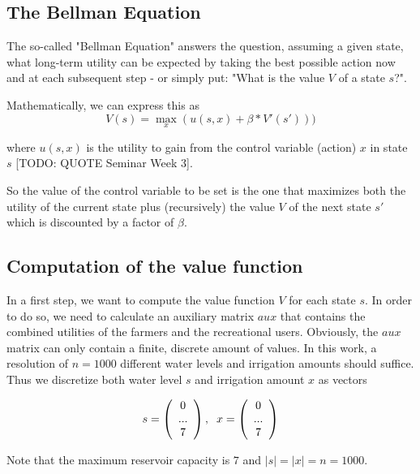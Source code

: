\documentclass[12pt, a4paper, oneside]{article}
\begin{document}
\subsection{The Bellman Equation}

The so-called "Bellman Equation" answers the question, assuming a given state, what long-term utility can be expected by taking the best possible action now and at each subsequent step - or simply put: "What is the value $V$ of a state $s$?". 

Mathematically, we can express this as  
\begin{equation}
V(s) = \max_{x}(u(s,x) + \beta*V'(s')))
\end{equation}

where $u(s,x)$ is the utility to gain from the control variable (action) $x$ in state $s$ [TODO: QUOTE Seminar Week 3]. 

So the value of the control variable to be set is the one that maximizes both the utility of the current state plus (recursively) the value $V$ of the next state $s'$ which is discounted by a factor of $\beta$. 


\subsection{Computation of the value function}

In a first step, we want to compute the value function $V$ for each state $s$. 
In order to do so, we need to calculate an auxiliary matrix $aux$ that contains the combined utilities of the farmers and the recreational users. 
Obviously, the $aux$ matrix can only contain a finite, discrete amount of values. In this work, a resolution of $n = 1000$ different water levels and irrigation amounts should suffice. 
Thus we discretize both water level $s$ and irrigation amount $x$ as vectors

	\begin{equation}
s = \left( \begin{array}{c}0\\...\\7\end{array}\right),\hspace{2mm}x = \left( \begin{array}{c}0\\...\\7\end{array}\right)
\end{equation}

Note that the maximum reservoir capacity is $7$ and $|s|=|x| = n = 1000$. 
\end{document}
